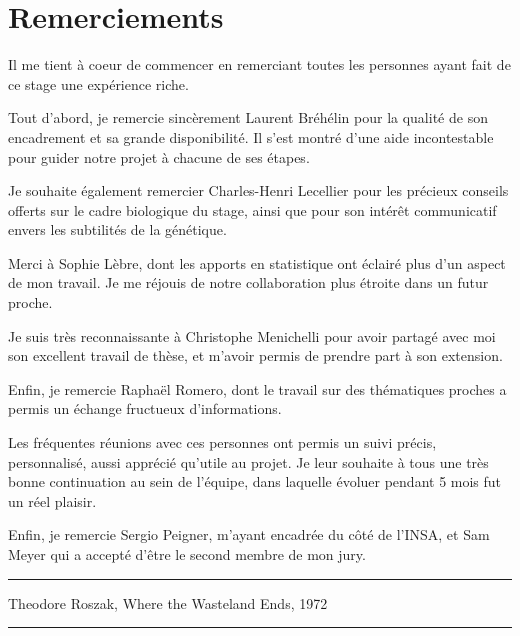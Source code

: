 \documentclass[french]{llncs}
\begin{document}
\clearpage
   



\clearpage\thispagestyle{empty}\addtocounter{page}{-1} 

\section*{Remerciements}

Il me tient à coeur de commencer en remerciant toutes les personnes ayant fait de ce stage une expérience riche.

Tout d'abord, je remercie sincèrement Laurent Bréhélin pour la qualité de son encadrement et sa grande disponibilité. Il s'est montré d'une aide incontestable pour guider notre projet à chacune de ses étapes. 

Je souhaite également remercier Charles-Henri Lecellier pour les précieux conseils offerts sur le cadre biologique du stage, ainsi que pour son intérêt communicatif envers les subtilités de la génétique.


Merci à Sophie Lèbre, dont les apports en statistique ont éclairé plus d'un aspect de mon travail. Je me réjouis de notre collaboration plus étroite dans un futur proche.

Je suis très reconnaissante à Christophe Menichelli pour avoir partagé avec moi son excellent travail de thèse, et m'avoir permis de prendre part à son extension. 

Enfin, je remercie Raphaël Romero, dont le travail sur des thématiques proches a permis un échange fructueux d'informations.

Les fréquentes réunions avec ces personnes ont permis un suivi précis, personnalisé, aussi apprécié qu'utile au projet. Je leur souhaite à tous une très bonne continuation au sein de l'équipe, dans laquelle évoluer pendant 5 mois fut un réel plaisir.


Enfin, je remercie Sergio Peigner, m'ayant encadrée du côté de l'INSA, et Sam Meyer qui a accepté d'être le second membre de mon jury.


\vfill

\hrule
\vfill
\begin{center}
Theodore Roszak, Where the Wasteland Ends, 1972
\end{center}
\vfill 
\hrule 
\vfill


\clearpage
\clearpage\thispagestyle{empty}\addtocounter{page}{-1} 
\tableofcontents
\end{document}
